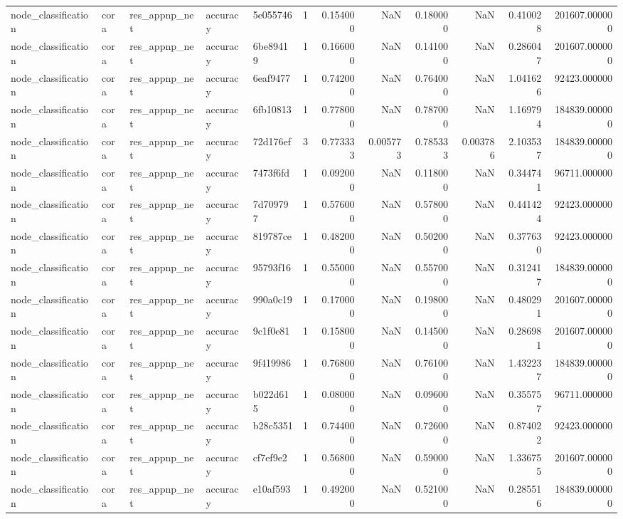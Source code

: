 \begin{tabular}{lllllrrrrrrr}
node_classification & cora & res_appnp_net & accuracy & 5e055746 & 1 & 0.154000 & NaN & 0.180000 & NaN & 0.410028 & 201607.000000 \\
node_classification & cora & res_appnp_net & accuracy & 6be89419 & 1 & 0.166000 & NaN & 0.141000 & NaN & 0.286047 & 201607.000000 \\
node_classification & cora & res_appnp_net & accuracy & 6eaf9477 & 1 & 0.742000 & NaN & 0.764000 & NaN & 1.041626 & 92423.000000 \\
node_classification & cora & res_appnp_net & accuracy & 6fb10813 & 1 & 0.778000 & NaN & 0.787000 & NaN & 1.169794 & 184839.000000 \\
node_classification & cora & res_appnp_net & accuracy & 72d176ef & 3 & 0.773333 & 0.005773 & 0.785333 & 0.003786 & 2.103537 & 184839.000000 \\
node_classification & cora & res_appnp_net & accuracy & 7473f6fd & 1 & 0.092000 & NaN & 0.118000 & NaN & 0.344741 & 96711.000000 \\
node_classification & cora & res_appnp_net & accuracy & 7d709797 & 1 & 0.576000 & NaN & 0.578000 & NaN & 0.441424 & 92423.000000 \\
node_classification & cora & res_appnp_net & accuracy & 819787ce & 1 & 0.482000 & NaN & 0.502000 & NaN & 0.377630 & 92423.000000 \\
node_classification & cora & res_appnp_net & accuracy & 95793f16 & 1 & 0.550000 & NaN & 0.557000 & NaN & 0.312417 & 184839.000000 \\
node_classification & cora & res_appnp_net & accuracy & 990a0c19 & 1 & 0.170000 & NaN & 0.198000 & NaN & 0.480291 & 201607.000000 \\
node_classification & cora & res_appnp_net & accuracy & 9c1f0e81 & 1 & 0.158000 & NaN & 0.145000 & NaN & 0.286981 & 201607.000000 \\
node_classification & cora & res_appnp_net & accuracy & 9f419986 & 1 & 0.768000 & NaN & 0.761000 & NaN & 1.432237 & 184839.000000 \\
node_classification & cora & res_appnp_net & accuracy & b022d615 & 1 & 0.080000 & NaN & 0.096000 & NaN & 0.355757 & 96711.000000 \\
node_classification & cora & res_appnp_net & accuracy & b28c5351 & 1 & 0.744000 & NaN & 0.726000 & NaN & 0.874022 & 92423.000000 \\
node_classification & cora & res_appnp_net & accuracy & cf7ef9e2 & 1 & 0.568000 & NaN & 0.590000 & NaN & 1.336755 & 201607.000000 \\
node_classification & cora & res_appnp_net & accuracy & e10af593 & 1 & 0.492000 & NaN & 0.521000 & NaN & 0.285516 & 184839.000000 \\

\end{tabular}

